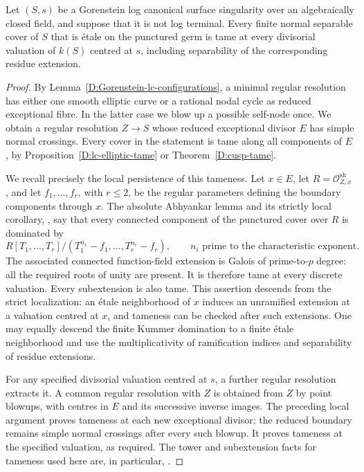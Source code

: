 
\begin{lemma}
\label{D:Gorenstein-lc-valuative-tame}
Let $(S,s)$ be a Gorenstein log canonical surface singularity
over an algebraically closed field, and suppose that it is not
log terminal.  Every finite normal separable cover of $S$ that
is \'etale on the punctured germ is tame at every divisorial
valuation of $k(S)$ centred at $s$, including separability of
the corresponding residue extension.
\end{lemma}
\begin{proof}
By Lemma~\ref{D:Gorenstein-lc-configurations}, a minimal regular
resolution has either one smooth elliptic curve or a rational
nodal cycle as reduced exceptional fibre.  In the latter case
we blow up a possible self-node once.  We obtain a regular
resolution $Z\to S$ whose reduced exceptional divisor $E$ has
simple normal crossings.  Every cover in the statement is
tame along all components of $E$, by
Proposition~\ref{D:lc-elliptic-tame} or
Theorem~\ref{D:cusp-tame}.

We recall precisely the local persistence of this tameness.
Let $x\in E$, let $R=\mathcal O_{Z,x}^{\mathrm{sh}}$, and let
$f_1,\ldots,f_r$, with $r\leq2$, be the regular parameters
defining the boundary components through $x$.
The absolute Abhyankar lemma and its strictly local
corollary, \cite[XIII, Proposition 5.2 and Corollary 5.3,
pp.~428--430]{SGA1}, say that every connected component
of the punctured cover over $R$ is dominated by
\[
 R[T_1,\ldots,T_r]/
       (T_1^{n_1}-f_1,\ldots,T_r^{n_r}-f_r),
 \qquad n_i\text{ prime to the characteristic exponent}.
\]
The associated connected function-field extension is
Galois of prime-to-$p$ degree: all the required roots
of unity are present.  It is therefore tame at every
discrete valuation.  Every subextension is also tame.
This assertion descends from the strict localization:
an \'etale neighborhood of $x$ induces an unramified
extension at a valuation centred at $x$, and tameness
can be checked after such extensions.  One may equally
descend the finite Kummer domination to a finite
\'etale neighborhood and use the multiplicativity of
ramification indices and separability of residue
extensions.

For any specified divisorial valuation centred at $s$,
a further regular resolution extracts it.  A common
regular resolution with $Z$ is obtained from $Z$ by
point blowups, with centres in $E$ and its successive
inverse images.  The preceding local argument proves
tameness at each new exceptional divisor; the reduced
boundary remains simple normal crossings after every
such blowup.  It proves tameness at the specified
valuation, as required.  The tower and subextension
facts for tameness used here are, in particular,
\cite[Lemmas 15.116.5--9, section tag 0EXT]{StacksBIndexTame}.
\end{proof}

